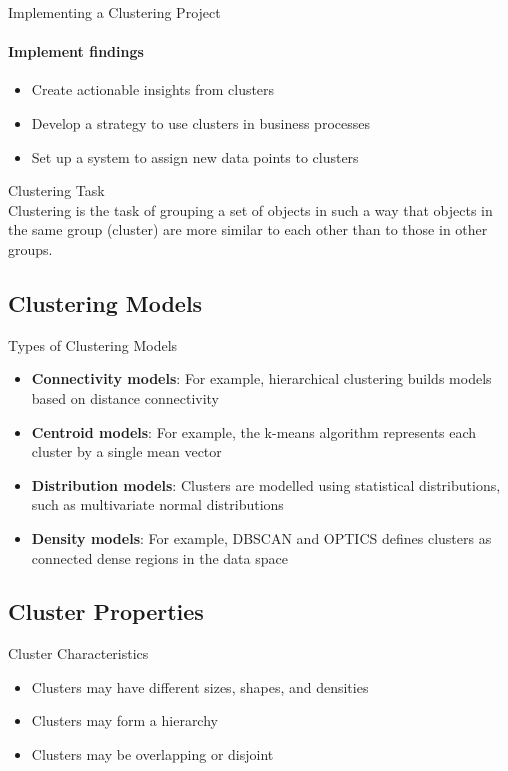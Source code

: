 \begin{KR}{Implementing a Clustering Project}
\paragraph{Implement findings}
\begin{itemize}
    \item Create actionable insights from clusters
    \item Develop a strategy to use clusters in business processes
    \item Set up a system to assign new data points to clusters
\end{itemize}
\end{KR}

\begin{definition}{Clustering Task}\\
Clustering is the task of grouping a set of objects in such a way that objects in the same group (cluster) are more similar to each other than to those in other groups.
\end{definition}

\subsection{Clustering Models}

\begin{concept}{Types of Clustering Models}
\begin{itemize}
    \item \textbf{Connectivity models}: For example, hierarchical clustering builds models based on distance connectivity
    \item \textbf{Centroid models}: For example, the k-means algorithm represents each cluster by a single mean vector
    \item \textbf{Distribution models}: Clusters are modelled using statistical distributions, such as multivariate normal distributions
    \item \textbf{Density models}: For example, DBSCAN and OPTICS defines clusters as connected dense regions in the data space
\end{itemize}
\end{concept}

\subsection{Cluster Properties}

\begin{concept}{Cluster Characteristics}
\begin{itemize}
    \item Clusters may have different sizes, shapes, and densities
    \item Clusters may form a hierarchy
    \item Clusters may be overlapping or disjoint
\end{itemize}
\end{concept}

